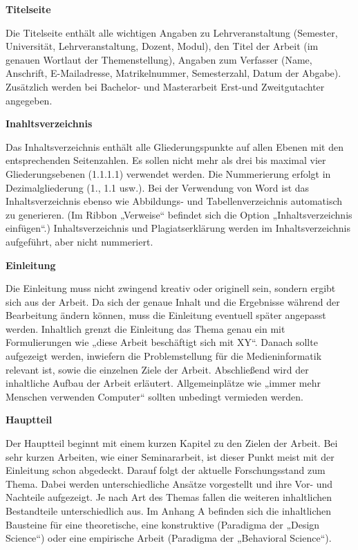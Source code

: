 \bigskip
\textbf{Titelseite}

Die Titelseite enthält alle wichtigen Angaben zu Lehrveranstaltung (Semester, Universität, Lehrveranstaltung, Dozent, Modul), den Titel der Arbeit (im genauen Wortlaut der Themenstellung), Angaben zum Verfasser (Name, Anschrift, E-Mailadresse, Matrikelnummer, Semesterzahl, Datum der Abgabe). Zusätzlich werden bei Bachelor- und Masterarbeit Erst-und Zweitgutachter angegeben.

\bigskip
\textbf{Inahltsverzeichnis}

Das Inhaltsverzeichnis enthält alle Gliederungspunkte auf allen Ebenen mit den entsprechenden Seitenzahlen. Es sollen nicht mehr als drei bis maximal vier Gliederungsebenen (1.1.1.1) verwendet werden. Die Nummerierung erfolgt in Dezimalgliederung (1., 1.1 usw.). Bei der Verwendung von Word ist das Inhaltsverzeichnis ebenso wie Abbildungs- und Tabellenverzeichnis automatisch zu generieren. (Im Ribbon „Verweise“ befindet sich die Option „Inhaltsverzeichnis einfügen“.) Inhaltsverzeichnis und Plagiatserklärung werden im Inhaltsverzeichnis aufgeführt, aber nicht nummeriert.

\bigskip
\textbf{Einleitung}

Die Einleitung muss nicht zwingend kreativ oder originell sein, sondern ergibt sich aus der Arbeit. Da sich der genaue Inhalt und die Ergebnisse während der Bearbeitung ändern können, muss die Einleitung eventuell später angepasst werden. Inhaltlich grenzt die Einleitung das Thema genau ein mit Formulierungen wie „diese Arbeit beschäftigt sich mit XY“. Danach sollte aufgezeigt werden, inwiefern die Problemstellung für die Medieninformatik relevant ist, sowie die einzelnen Ziele der Arbeit. Abschließend wird der inhaltliche Aufbau der Arbeit erläutert. Allgemeinplätze wie „immer mehr Menschen verwenden Computer“ sollten unbedingt vermieden werden.

\bigskip
\textbf{Hauptteil}

Der Hauptteil beginnt mit einem kurzen Kapitel zu den Zielen der Arbeit. Bei sehr kurzen Arbeiten, wie einer Seminararbeit, ist dieser Punkt meist mit der Einleitung schon abgedeckt. Darauf folgt der aktuelle Forschungsstand zum Thema. Dabei werden unterschiedliche Ansätze vorgestellt und ihre Vor- und Nachteile aufgezeigt. Je nach Art des Themas fallen die weiteren inhaltlichen Bestandteile unterschiedlich aus. Im Anhang A befinden sich die inhaltlichen Bausteine für eine theoretische, eine konstruktive (Paradigma der „Design Science“) oder eine empirische Arbeit (Paradigma der „Behavioral Science“).

